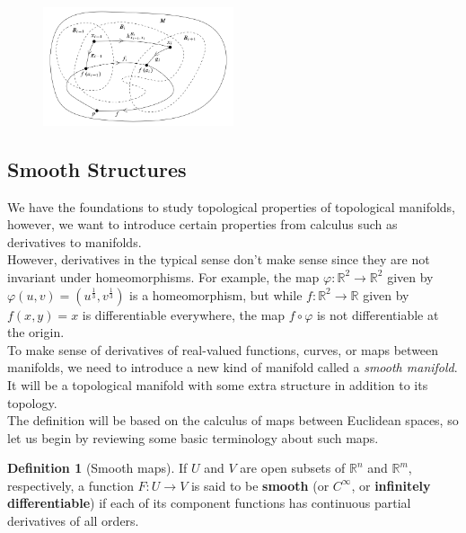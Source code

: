 \documentclass[reqno]{amsart}
\theoremstyle{plain}%
\theoremstyle{definition}
\newtheorem{definition}[theorem]{Definition}
\theoremstyle{remark}
\begin{document}
    \begin{figure}[H]
        \centering
        \includegraphics[width=0.5\textwidth]{manifold-fundamental-group.png}
        \label{fig:manifold-fundamental-group-png}
    \end{figure}

    \subsection*{Smooth Structures}
            We have the foundations to study topological properties of topological
            manifolds, however, we want to introduce certain properties from calculus such
            as derivatives to manifolds.\\
            However, derivatives in the typical sense don't make sense since they are not
            invariant under homeomorphisms. For example, the map $\varphi  \colon
            \mathbb{R}^2 \to \mathbb{R}^2$ given by $\varphi \left( u,v \right) 
            = \left( u^{\frac{1}{3}}, v^{\frac{1}{3}} \right) $ is a homeomorphism, but
            while
            $f  \colon \mathbb{R}^2 \to \mathbb{R}$ given by $f(x,y) = x$ is differentiable
            everywhere, the map $f \circ \varphi$ is not differentiable at the origin.\\
            \linebreak
            To make sense of derivatives of real-valued functions, curves, or maps between
            manifolds, we need to introduce a new kind of manifold called a \textit{smooth
            manifold}. It will be a topological manifold with some extra structure in
            addition to its topology.\\
            \linebreak
            The definition will be based on the calculus of maps between Euclidean spaces,
            so let us begin by reviewing some basic terminology about such maps.
            \begin{definition}[Smooth maps]
                If $U$ and $V$ are open subsets of $\mathbb{R}^{n}$ and $\mathbb{R}^{m}$,
                respectively, a function $F  \colon U \to V$ is said to be
                \textbf{smooth} (or \textbf{$C^{\infty}$}, or \textbf{infinitely
                differentiable}) if each of its component functions has continuous partial
                derivatives of all orders.
            \end{definition}
\end{document}
